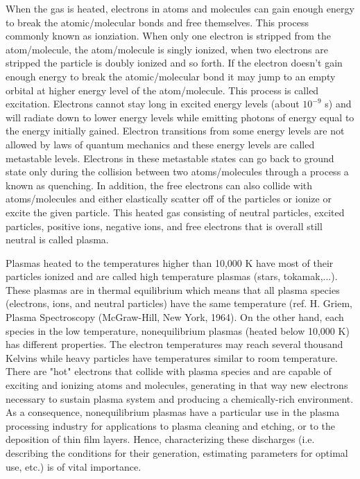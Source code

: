 \documentclass[12pt]{article}
\begin{document}
When the gas is heated, electrons in atoms and molecules can gain enough energy to break the atomic/molecular bonds and free themselves. This process commonly known as ionziation. When only one electron is stripped from the atom/molecule, the atom/molecule is singly ionized, when two electrons are stripped the particle is doubly ionized and so forth. If the electron doesn't gain enough energy to break the atomic/molecular bond it may jump to an empty orbital at higher energy level of the atom/molecule. This process is called excitation. Electrons cannot stay long in excited energy levels (about $10^{-9}$ s) and will radiate down to lower energy levels while emitting photons of energy equal to the energy initially gained. Electron transitions from some energy levels are not allowed by laws of quantum mechanics and these energy levels are called metastable levels. Electrons in these metastable states can go back to ground state only during the collision between two atoms/molecules through a process a known as quenching. In addition, the free electrons can also collide with atoms/molecules and either elastically scatter off of the particles or ionize or excite the given particle. This heated gas consisting of neutral particles, excited particles, positive ions, negative ions, and free electrons that is overall still neutral is called plasma.

Plasmas heated to the temperatures higher than 10,000 K have most of their particles ionized and are called high temperature plasmas (stars, tokamak,...). These plasmas are in thermal equilibrium which means that all plasma species (electrons, ions, and neutral particles) have the same temperature (ref. H. Griem, Plasma Spectroscopy (McGraw-Hill, New York, 1964). On the other hand, each species in the low temperature, nonequilibrium plasmas (heated below 10,000 K) has different properties. The electron temperatures may reach several thousand Kelvins while heavy particles have temperatures similar to room temperature. There are "hot" electrons that collide with plasma species and are capable of exciting and ionizing atoms and molecules, generating in that way new electrons necessary to sustain plasma system and producing a chemically-rich environment. As a consequence, nonequilibrium plasmas have a particular use in the plasma processing industry for applications to plasma cleaning and etching, or to the deposition of thin film layers. Hence, characterizing these discharges (i.e. describing the conditions for their generation, estimating parameters for optimal use, etc.) is of vital importance. 
\end{document}
